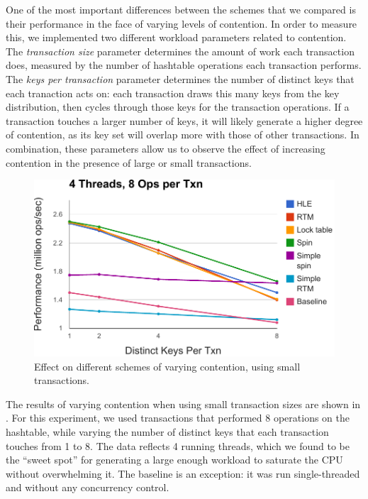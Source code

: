 One of the most important differences between the schemes that we compared is
their performance in the face of varying levels of contention. In order to
measure this, we implemented two different workload parameters related to
contention. The \textit{transaction size} parameter determines the amount of
work each transaction does, measured by the number of hashtable operations each
transaction performs.  The \textit{keys per transaction} parameter determines
the number of distinct keys that each tranaction acts on: each transaction draws
this many keys from the key distribution, then cycles through those keys for the
transaction operations. If a transaction touches a larger number of keys, it
will likely generate a higher degree of contention, as its key set will overlap
more with those of other transactions. In combination, these parameters allow us
to observe the effect of increasing contention in the presence of large or small
transactions.

\begin{figure}[h!]
  \centering
  \includegraphics[scale=0.575]{figure/small_txns.pdf}
  \caption{Effect on different schemes of varying contention, using small
    transactions.}
  \label{fig:small_txns} 
\end{figure}

The results of varying contention when using small transaction sizes are shown
in . For this experiment, we used transactions that
performed 8 operations on the hashtable, while varying the number of distinct
keys that each transaction touches from 1 to 8. The data reflects 4 running
threads, which we found to be the ``sweet spot'' for generating a large enough
workload to saturate the CPU without overwhelming it. The baseline is an
exception: it was run single-threaded and without any concurrency control.

